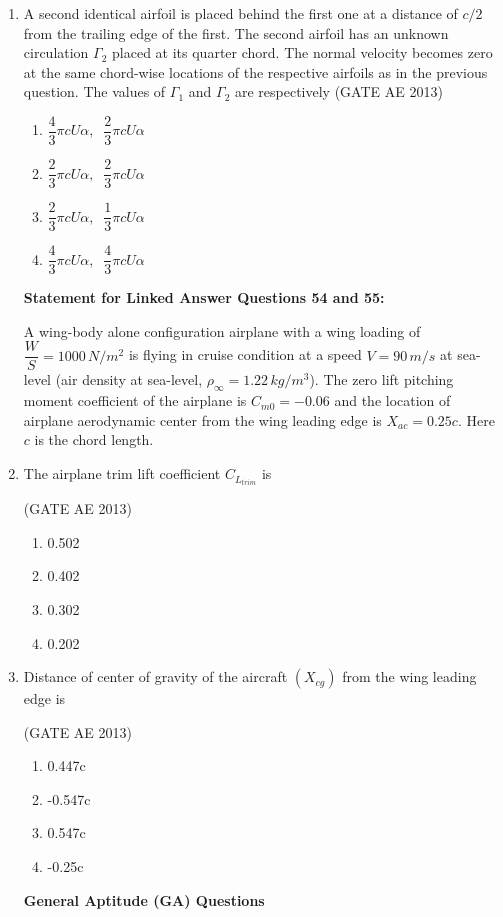 \documentclass[journal,12pt,onecolumn]{IEEEtran}
\theoremstyle{remark}
\begin{document}
\begin{flushleft}
\begin{enumerate}
\item A second identical airfoil is placed behind the first one at a distance of $c/2$ from the trailing edge of the first. The second airfoil has an unknown circulation $\Gamma_2$ placed at its quarter chord. The normal velocity becomes zero at the same chord-wise locations of the respective airfoils as in the previous question. The values of $\Gamma_1$ and $\Gamma_2$ are respectively \hfill(GATE AE 2013)
\begin{multicols}{2}
\begin{enumerate}
\item $\dfrac{4}{3}\pi cU \alpha, \;\; \dfrac{2}{3}\pi cU \alpha$
\item $\dfrac{2}{3}\pi cU \alpha, \;\; \dfrac{2}{3}\pi cU \alpha$
\item $\dfrac{2}{3}\pi cU \alpha, \;\; \dfrac{1}{3}\pi cU \alpha$
\item $\dfrac{4}{3}\pi cU \alpha, \;\; \dfrac{4}{3}\pi cU \alpha$
\end{enumerate}
\end{multicols}

\textbf{Statement for Linked Answer Questions 54 and 55:}

A wing-body alone configuration airplane with a wing loading of $\dfrac{W}{S} = 1000 \, N/m^2$ is flying in cruise condition at a speed $V = 90 \, m/s$ at sea-level (air density at sea-level, $\rho_\infty = 1.22 \, kg/m^3$). The zero lift pitching moment coefficient of the airplane is $C_{m0} = -0.06$ and the location of airplane aerodynamic center from the wing leading edge is $X_{ac} = 0.25c$. Here $c$ is the chord length.

\item The airplane trim lift coefficient $C_{L_{trim}}$ is 

\hfill(GATE AE 2013)
\begin{multicols}{2}
\begin{enumerate}
\item 0.502
\item 0.402
\item 0.302
\item 0.202
\end{enumerate}
\end{multicols}

\item Distance of center of gravity of the aircraft $(X_{cg})$ from the wing leading edge is 

\hfill(GATE AE 2013)
\begin{multicols}{2}
\begin{enumerate}
\item 0.447c
\item -0.547c
\item 0.547c
\item -0.25c
\end{enumerate}
\end{multicols}
\begin{center}
\textbf{General Aptitude (GA) Questions}     
\end{center}



\end{enumerate}
\end{flushleft}
\end{document}
